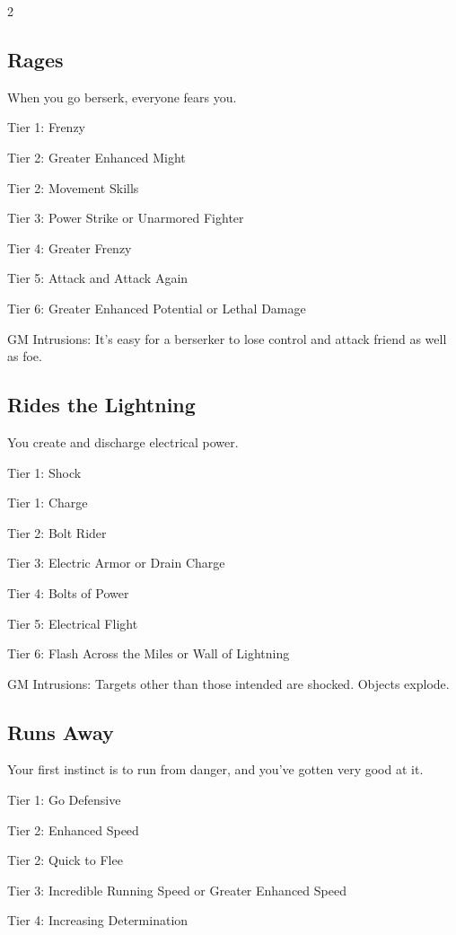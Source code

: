 \begin{multicols}{2}
\subsection{Rages}

When you go berserk, everyone fears you.

Tier 1: Frenzy

Tier 2: Greater Enhanced Might

Tier 2: Movement Skills

Tier 3: Power Strike or Unarmored Fighter

Tier 4: Greater Frenzy

Tier 5: Attack and Attack Again

Tier 6: Greater Enhanced Potential or Lethal Damage

GM Intrusions: It’s easy for a berserker to lose control and attack friend as well as foe.

\subsection{Rides the Lightning}

You create and discharge electrical power.

Tier 1: Shock

Tier 1: Charge

Tier 2: Bolt Rider 

Tier 3: Electric Armor or Drain Charge

Tier 4: Bolts of Power

Tier 5: Electrical Flight

Tier 6: Flash Across the Miles or Wall of Lightning

GM Intrusions: Targets other than those intended are shocked. Objects explode.

\subsection{Runs Away}

Your first instinct is to run from danger, and you’ve gotten very good at it.

Tier 1: Go Defensive

Tier 2: Enhanced Speed

Tier 2: Quick to Flee

Tier 3: Incredible Running Speed or Greater Enhanced Speed

Tier 4: Increasing Determination


\end{multicols}

